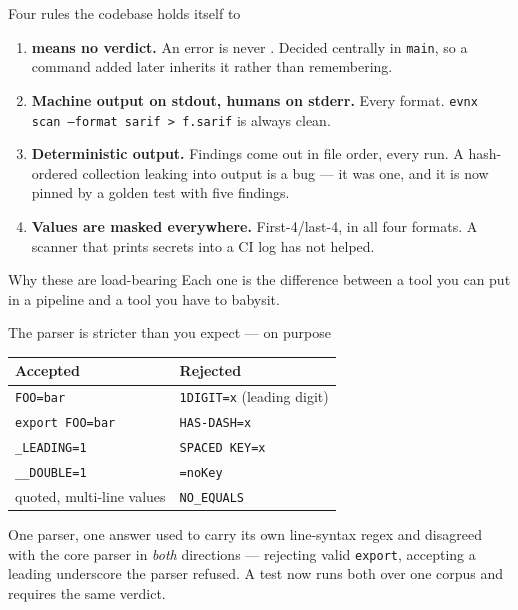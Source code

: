 \documentclass[aspectratio=169,10pt]{beamer}
\begin{document}
\begin{frame}{Four rules the codebase holds itself to}
  \begin{enumerate}
    \item \textbf{\exittwo{} means no verdict.} An error is never \exitone.
          Decided centrally in \texttt{main}, so a command added later inherits
          it rather than remembering.
    \item \textbf{Machine output on stdout, humans on stderr.} Every format.
          \texttt{evnx scan --format sarif > f.sarif} is always clean.
    \item \textbf{Deterministic output.} Findings come out in file order, every
          run. A hash-ordered collection leaking into output is a bug --- it was
          one, and it is now pinned by a golden test with five findings.
    \item \textbf{Values are masked everywhere.} First-4/last-4, in all four
          formats. A scanner that prints secrets into a CI log has not helped.
  \end{enumerate}

  \vspace{0.6em}
  \begin{block}{Why these are load-bearing}
    Each one is the difference between a tool you can put in a pipeline and a
    tool you have to babysit.
  \end{block}
\end{frame}

\begin{frame}{The parser is stricter than you expect --- on purpose}
  \begin{center}
  \begin{tabular}{@{}ll@{}}
    \toprule
    \textbf{Accepted} & \textbf{Rejected} \\
    \midrule
    \texttt{FOO=bar} & \texttt{1DIGIT=x} (leading digit) \\
    \texttt{export FOO=bar} & \texttt{HAS-DASH=x} \\
    \texttt{\_LEADING=1} & \texttt{SPACED KEY=x} \\
    \texttt{\_\_DOUBLE=1} & \texttt{=noKey} \\
    quoted, multi-line values & \texttt{NO\_EQUALS} \\
    \bottomrule
  \end{tabular}
  \end{center}

  \vspace{0.7em}
  \begin{alertblock}{One parser, one answer}
     used to carry its own line-syntax regex and disagreed with the
    core parser in \emph{both} directions --- rejecting valid \texttt{export},
    accepting a leading underscore the parser refused. A test now runs both over
    one corpus and requires the same verdict.
  \end{alertblock}
\end{frame}
\end{document}
